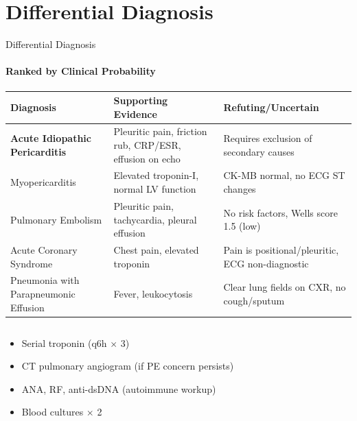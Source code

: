 \documentclass[10pt,aspectratio=169]{beamer}
\begin{document}
\section{Differential Diagnosis}
\begin{frame}{Differential Diagnosis}
  \framesubtitle{Ranked by Clinical Probability}

  \begin{tcolorbox}[infobox,title={\faBalanceScale\hspace{4pt}Diagnostic Assessment}]
    \small
    \renewcommand{\arraystretch}{1.35}
    \begin{tabular}{@{}>{\raggedright\arraybackslash}p{}>{\raggedright\arraybackslash}p{}>{\raggedright\arraybackslash}p{}@{}}
      \toprule
      \textbf{Diagnosis} & \textbf{Supporting Evidence} & \textbf{Refuting/Uncertain} \\
      \midrule
      \textbf{Acute Idiopathic Pericarditis} & Pleuritic pain, friction rub, CRP/ESR, effusion on echo & Requires exclusion of secondary causes \\
      Myopericarditis & Elevated troponin-I, normal LV function & CK-MB normal, no ECG ST changes \\
      Pulmonary Embolism & Pleuritic pain, tachycardia, pleural effusion & No risk factors, Wells score 1.5 (low) \\
      Acute Coronary Syndrome & Chest pain, elevated troponin & Pain is positional/pleuritic, ECG non-diagnostic \\
      Pneumonia with Parapneumonic Effusion & Fever, leukocytosis & Clear lung fields on CXR, no cough/sputum \\
      \bottomrule
    \end{tabular}
  \end{tcolorbox}

  \vspace{0.3cm}

  \begin{columns}[T]
    \begin{tcolorbox}[alertbox,title={\faExclamationCircle\hspace{4pt}Pending Studies}]
      \small
      \begin{itemize}
        \item Serial troponin (q6h $\times$ 3)
        \item CT pulmonary angiogram (if PE concern persists)
        \item ANA, RF, anti-dsDNA (autoimmune workup)
        \item Blood cultures $\times$ 2
      \end{itemize}
    \end{tcolorbox}


\end{columns}
\end{frame}
\end{document}
